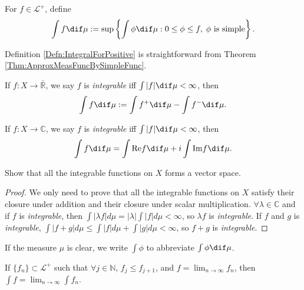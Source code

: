 \begin{defn}
    \label{Defn:IntegralForPositive}
    For $f\in \mathcal{L}^{+}$, define 
    \begin{displaymath}
        \int f\dif\mu:=\sup\left\{\int\phi\dif\mu:0\le\phi\le f,
        \;\phi\text{ is simple}\right\}.
    \end{displaymath}
\end{defn}
\begin{rem}
    Definition \ref{Defn:IntegralForPositive} is straightforward 
    from Theorem \ref{Thm:ApproxMeasFuncBySimpleFunc}.
\end{rem}
\begin{defn}
    \label{Defn:RealValuedFuncInt}
    If $f:X\rightarrow\bar{\mathbb{R}}$, we say 
    $f$ is \textit{integrable} iff $\int|f|\dif\mu<\infty$, 
    then 
    \begin{displaymath}
        \int f\dif\mu:=\int f^{+}\dif\mu-\int f^{-}\dif\mu.
    \end{displaymath}
\end{defn}
\begin{defn}
    \label{Defn:ComplexValuedFuncInt}
    If $f:X\rightarrow\mathbb{C}$, we say $f$ is \textit{integrable} 
    iff $\int|f|\dif\mu<\infty$, then 
    \begin{displaymath}
        \int f\dif\mu=\int \text{Re}f\dif\mu+i\int\text{Im}f\dif\mu.
    \end{displaymath}
\end{defn}
\begin{exc}
    Show that all the integrable 
    functions on $X$ forms a vector space.
\end{exc}
\begin{proof}
    We only need to prove that all the integrable 
    functions on $X$ satisfy their closure under addition
    and their closure under scalar multiplication. 
    $\forall \lambda\in\mathbb{C}$ and if $f$ 
    is \textit{integrable}, then 
    $\int|\lambda f|d\mu=|\lambda|\int|f|d\mu<\infty$,
    so $\lambda f$ is \textit{integrable}.
    If $f$ and $g$ is \textit{integrable},
    $\int|f+g|d\mu\leq\int|f|d\mu+\int|g|d\mu<\infty$,
    so $f+g$ is \textit{integrable}.
\end{proof}
\begin{ntn}
    If the measure $\mu$ is clear, 
    we write $\int\phi$ to abbreviate $\int\phi\dif\mu$.
\end{ntn}
\begin{thm}
    \label{Thm:MCT}
    If $\{f_{n}\}\subset\mathcal{L}^{+}$ such that 
    $\forall j\in\mathbb{N}$, $f_j\le f_{j+1}$, and 
    $f=\lim_{n\rightarrow\infty}f_{n}$, then 
    $\int f=\lim_{n\rightarrow\infty}\int f_n$.
\end{thm}
